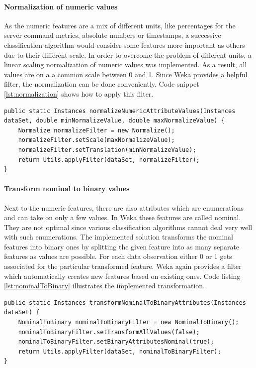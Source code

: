\paragraph{Normalization of numeric values}
As the numeric features are a mix of different units, like percentages for the server command metrics, absolute numbers or timestamps, a successive classification algorithm would consider some features more important as others due to their different scale. In order to overcome the problem of different units, a linear scaling normalization of numeric values was implemented. As a result, all values are on a a common scale between 0 and 1. Since Weka provides a helpful filter, the normalization can be done conveniently. Code snippet \ref{lst:normalization} shows how to apply this filter.

\begin{lstlisting}[caption={Normalization of numeric feature values}, label={lst:normalization}]
public static Instances normalizeNumericAttributeValues(Instances dataSet, double minNormalizeValue, double maxNormalizeValue) {
	Normalize normalizeFilter = new Normalize();
	normalizeFilter.setScale(maxNormalizeValue);
	normalizeFilter.setTranslation(minNormalizeValue);
	return Utils.applyFilter(dataSet, normalizeFilter);
}
\end{lstlisting}

\paragraph{Transform nominal to binary values}
Next to the numeric features, there are also attributes which are enumerations and can take on only a few values. In Weka these features are called nominal. They are not optimal since various classification algorithms cannot deal very well with such enumerations. The implemented solution transforms the nominal features into binary ones by splitting the given feature into as many separate features as values are possible. For each data observation either 0 or 1 gets associated for the particular transformed feature. 
Weka again provides a filter which automatically creates new features based on existing ones. 
Code listing \ref{lst:nominalToBinary} illustrates the implemented transformation.

\begin{lstlisting}[caption={Transformation of nominal- to binary features}, label={lst:nominalToBinary}]
public static Instances transformNominalToBinaryAttributes(Instances dataSet) {
	NominalToBinary nominalToBinaryFilter = new NominalToBinary();
	nominalToBinaryFilter.setTransformAllValues(false);
	nominalToBinaryFilter.setBinaryAttributesNominal(true);
	return Utils.applyFilter(dataSet, nominalToBinaryFilter);
}
\end{lstlisting}

